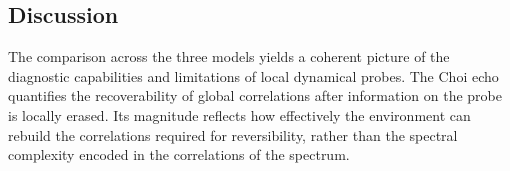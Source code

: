 \documentclass[pra,twocolumn,aps,showpacs,superscriptaddress,longbibliography]{revtex4-2}
\newcommand{\choip}{\langle \text{Tr}[\mathcal{D}(t)^2] \rangle_{\mathrm{Haar}, t}}
\newcommand{\statep}{\overline{\mathcal{P}}}
\newcommand{\mlsr}{\ev{\tilde{r}}}
\begin{document}
%
%

\subsection{Discussion}\label{sec:discussion}
The comparison across the three models yields a coherent picture of the diagnostic capabilities and limitations of local dynamical probes. The Choi echo quantifies the recoverability of global correlations after information on the probe is locally erased. Its magnitude reflects how effectively the environment can rebuild the correlations required for reversibility, rather than the spectral complexity encoded in the correlations of the spectrum.
\end{document}
